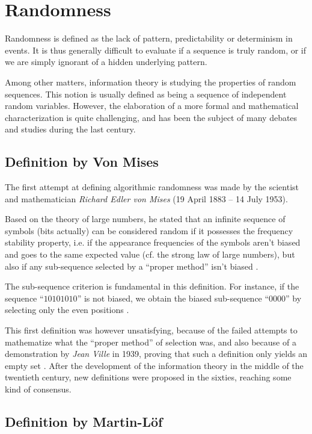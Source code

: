 \documentclass{llncs}
\begin{document}
\section{Randomness}
\label{sec:rand}


Randomness is defined as the lack of pattern, predictability or determinism in events. It is thus generally difficult to evaluate if a sequence is truly random, or if we are simply ignorant of a hidden underlying pattern.

Among other matters, information theory is studying the properties of random sequences. This notion is usually defined as being a sequence of independent random variables. However, the elaboration of a more formal and mathematical characterization is quite challenging, and has been the subject of many debates and studies during the last century.

\subsection{Definition by Von Mises}


The first attempt at defining algorithmic randomness was made by the scientist and mathematician \emph{Richard Edler von Mises} (19 April 1883 – 14 July 1953).

Based on the theory of large numbers, he stated that an infinite sequence of symbols (bits actually) can be considered random if it possesses the frequency stability property, i.e. if the appearance frequencies of the symbols aren't biased and goes to the same expected value (cf. the strong law of large numbers), but also if any sub-sequence selected by a ``proper method'' isn't biased \cite{down}.

The sub-sequence criterion is fundamental in this definition. For instance, if the sequence “$10101010$” is not biased, we obtain the biased sub-sequence “$0000$” by selecting only the even positions \cite{down}.

This first definition was however unsatisfying, because of the failed attempts to mathematize what the “proper method” of selection was, and also because of a demonstration by \emph{Jean Ville} in 1939, proving that such a definition only yields an empty set \cite{down}. After the development of the information theory in the middle of the twentieth century, new definitions were proposed in the sixties, reaching some kind of consensus.

\subsection{Definition by Martin-L\"{o}f}
\end{document}
